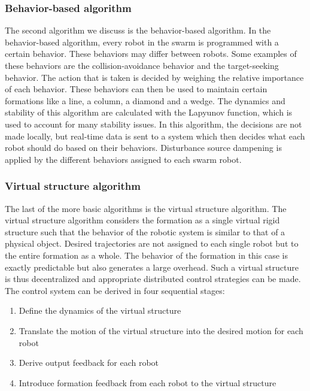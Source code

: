 \subsubsection{Behavior-based algorithm}
The second algorithm we discuss is the behavior-based algorithm. 
In the behavior-based algorithm, every robot in the swarm is programmed with a certain behavior. 
These behaviors may differ between robots.
Some examples of these behaviors are the collision-avoidance behavior and the target-seeking behavior. 
The action that is taken is decided by weighing the relative importance of each behavior. \cite{consolini2008leader}
These behaviors can then be used to maintain certain formations like a line, a column, a diamond and a wedge. \cite{balch1998behavior}
The dynamics and stability of this algorithm are calculated with the Lapyunov function, which is used to account for many stability issues. \cite{lawton2003decentralized}
In this algorithm, the decisions are not made locally, but real-time data is sent to a system which then decides what each robot should do based on their behaviors.
Disturbance source dampening is applied by the different behaviors assigned to each swarm robot.

\subsubsection{Virtual structure algorithm}
The last of the more basic algorithms is the virtual structure algorithm. 
The virtual structure algorithm considers the formation as a single virtual rigid structure such that the behavior of the robotic system is similar to that of a physical object. 
Desired trajectories are not assigned to each single robot but to the entire formation as a whole. 
The behavior of the formation in this case is exactly predictable but also generates a  large overhead. \cite{consolini2008leader}
Such a virtual structure is thus decentralized and appropriate distributed control strategies can be made. \cite{ren2004decentralized}
The control system can be derived in four sequential stages: \cite{do2007nonlinear}
\begin{enumerate}
	\item Define the dynamics of the virtual structure 
	\item Translate the motion of the virtual structure into the desired motion for each robot
	\item Derive output feedback for each robot
	\item Introduce formation feedback from each robot to the virtual structure
\end{enumerate} 

